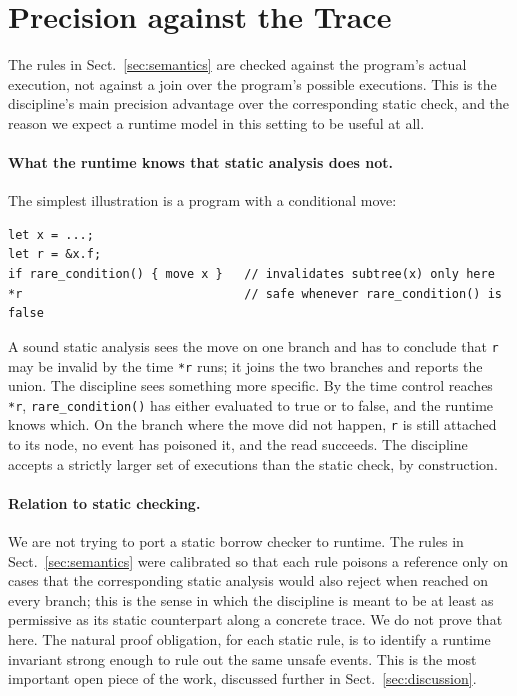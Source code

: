 \section{Precision against the Trace}\label{sec:precision}

The rules in Sect.~\ref{sec:semantics} are checked against the
program's actual execution, not against a join over the program's
possible executions. This is the discipline's main precision
advantage over the corresponding static check, and the reason we
expect a runtime model in this setting to be useful at all.

\paragraph{What the runtime knows that static analysis does not.}
The simplest illustration is a program with a conditional move:
\begin{lstlisting}
let x = ...;
let r = &x.f;
if rare_condition() { move x }   // invalidates subtree(x) only here
*r                               // safe whenever rare_condition() is false
\end{lstlisting}
A sound static analysis sees the move on one branch and has to
conclude that \texttt{r} may be invalid by the time \texttt{*r} runs;
it joins the two branches and reports the union. The discipline
sees something more specific. By the time control reaches \texttt{*r},
\texttt{rare\_condition()} has either evaluated to true or to false,
and the runtime knows which. On the branch where the move did not
happen, \texttt{r} is still attached to its node, no event has
poisoned it, and the read succeeds. The discipline accepts a
strictly larger set of executions than the static check, by
construction.

\paragraph{Relation to static checking.}
We are not trying to port a static borrow checker to runtime. The
rules in Sect.~\ref{sec:semantics} were calibrated so that each rule
poisons a reference only on cases that the corresponding static
analysis would also reject when reached on every branch; this is the
sense in which the discipline is meant to be at least as permissive
as its static counterpart along a concrete trace. We do not prove
that here. The natural proof obligation, for each static rule, is to
identify a runtime invariant strong enough to rule out the same
unsafe events. This is the most important open piece of the work,
discussed further in Sect.~\ref{sec:discussion}.

